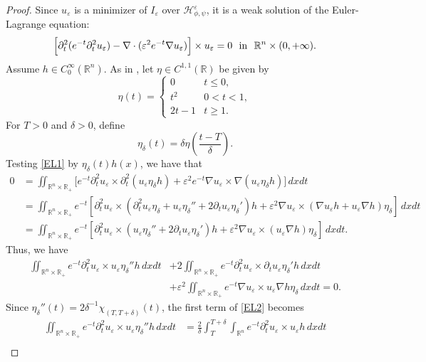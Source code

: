\documentclass[12pt,twoside,reqno]{amsart}
\theoremstyle{definition}              %
\theoremstyle{remark}                  %
\newcommand{\R}{\mathbb{R}}                 %
\newcommand{\eps}{\varepsilon}
\renewcommand{\1}{\mathbbm{1}}                                      %
\numberwithin{equation}{section}
\numberwithin{definition}{section}
\numberwithin{theorem}{section}
\numberwithin{remark}{section}
\begin{document}
\begin{proof} Since $u_\eps$ is a minimizer of $I_\eps$ over
$\mathcal{H}_{\phi,\psi}^\eps$, it is a weak solution of the Euler-Lagrange equation:
\begin{align}\label{EL1}
\Big[\partial_t^2(e^{-t}\partial_t^2u_\eps)-\nabla\cdot(\eps^2 e^{-t}\nabla u_\eps)\Big]\times u_\eps=0
\ \ {\rm{in}}\ \ \R^n\times(0,+\infty). 
\end{align}
Assume $h\in C_0^\infty(\mathbb{R}^n)$. As in \cite[Theorem 4.2]{Serra-Tilli2012}, let $\eta\in C^{1,1}(\mathbb{R})$ be given by
\[
\eta(t)=\begin{cases} 0 & t\le 0,\\
t^2 & 0<t<1,\\
2t-1 & t\ge 1.  
\end{cases}
\]
For $T>0$ and $\delta>0$, define
$$
\eta_\delta(t)=\delta\eta(\frac{t-T}{\delta}).
$$
Testing \eqref{EL1} by $\eta_\delta(t)h(x)$, we have that
\begin{align*}
0&=\iint_{\mathbb{R}^n\times\R_+}
\Big[e^{-t}\partial_t^2u_\eps\times \partial_t^2(u_\eps \eta_\delta h)+\eps^2 e^{-t}\nabla u_\eps\times \nabla(u_\eps\eta_\delta h)\Big]\,dxdt\\
&=\iint_{\mathbb{R}^n\times\R_+}
e^{-t}[\partial_t^2u_\eps\times (\partial_t^2u_\eps\eta_\delta +u_\eps \eta_\delta''+2\partial_t u_\eps\eta_\delta')h+\eps^2 
\nabla u_\eps\times (\nabla u_\eps h+u_\eps \nabla h) \eta_\delta]\,dxdt\\
&=\iint_{\mathbb{R}^n\times\R_+}
e^{-t}[\partial_t^2u_\eps\times (u_\eps \eta_\delta''+2\partial_tu_\eps\eta_\delta')h+\eps^2\nabla u_\eps\times (u_\eps \nabla h) \eta_\delta]\,dxdt.
\end{align*}
Thus, we have
\begin{align}\label{EL2}
\iint_{\mathbb{R}^n\times\R_+}
e^{-t}\partial_t^2u_\eps\times u_\eps \eta_\delta''h\,dxdt&+2\iint_{\mathbb{R}^n\times\R_+}e^{-t}\partial_t^2u_\eps\times \partial_tu_\eps\eta_\delta' h\,dxdt\nonumber\\
&+\eps^2\iint_{\mathbb{R}^n\times\R_+}e^{-t}\nabla u_\eps\times u_\eps \nabla h \eta_\delta\,dxdt=0.
\end{align}
Since $\eta_\delta''(t)=2\delta^{-1}\chi_{(T,T+\delta)}(t)$, the first term of \eqref{EL2} becomes
\begin{align*}
\iint_{\mathbb{R}^n\times\R_+}
e^{-t}\partial_t^2u_\eps\times u_\eps \eta_\delta''h\,dxdt
&=\frac{2}{\delta}\int_{T}^{T+\delta} 
\int_{\mathbb{R}^n} e^{-t} \partial_t^2 u_\eps\times u_\eps h\,dxdt
\nonumber\\

\end{align*}
\end{proof}
\end{document}
